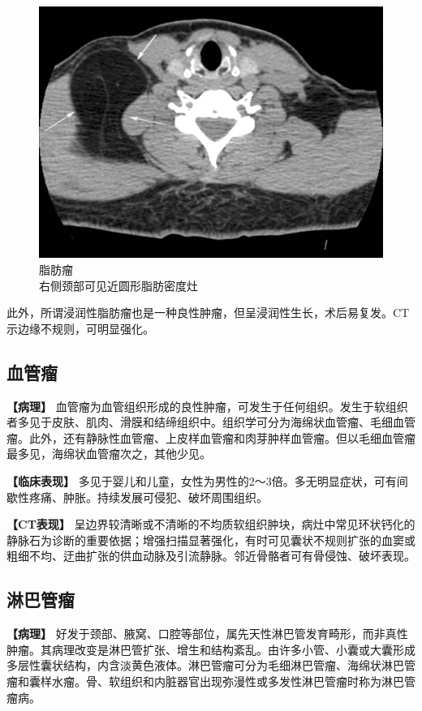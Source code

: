 \begin{figure}[!htbp]
 \centering
 \includegraphics[width=.7\textwidth,height=\textheight,keepaspectratio]{./images/Image00449.jpg}
 \captionsetup{justification=centering}
 \caption{脂肪瘤\\{\small 右侧颈部可见近圆形脂肪密度灶}}
 \label{fig22-24}
  \end{figure} 

此外，所谓浸润性脂肪瘤也是一种良性肿瘤，但呈浸润性生长，术后易复发。CT示边缘不规则，可明显强化。

\subsection{血管瘤}

\textbf{【病理】}
血管瘤为血管组织形成的良性肿瘤，可发生于任何组织。发生于软组织者多见于皮肤、肌肉、滑膜和结缔组织中。组织学可分为海绵状血管瘤、毛细血管瘤。此外，还有静脉性血管瘤、上皮样血管瘤和肉芽肿样血管瘤。但以毛细血管瘤最多见，海绵状血管瘤次之，其他少见。

\textbf{【临床表现】}
多见于婴儿和儿童，女性为男性的2～3倍。多无明显症状，可有间歇性疼痛、肿胀。持续发展可侵犯、破坏周围组织。

\textbf{【CT表现】}
呈边界较清晰或不清晰的不均质软组织肿块，病灶中常见环状钙化的静脉石为诊断的重要依据；增强扫描显著强化，有时可见囊状不规则扩张的血窦或粗细不均、迂曲扩张的供血动脉及引流静脉。邻近骨骼者可有骨侵蚀、破坏表现。

\subsection{淋巴管瘤}

\textbf{【病理】}
好发于颈部、腋窝、口腔等部位，属先天性淋巴管发育畸形，而非真性肿瘤。其病理改变是淋巴管扩张、增生和结构紊乱。由许多小管、小囊或大囊形成多层性囊状结构，内含淡黄色液体。淋巴管瘤可分为毛细淋巴管瘤、海绵状淋巴管瘤和囊样水瘤。骨、软组织和内脏器官出现弥漫性或多发性淋巴管瘤时称为淋巴管瘤病。


